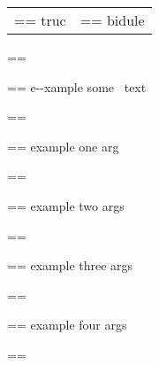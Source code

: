 \documentclass{book}
\makeatletter
\newenvironment{Texinfopreformatted}{%
  \par\GNUTobeylines\obeyspaces\frenchspacing\parskip=\z@\parindent=\z@}{}
{\catcode`\^^M=13 \gdef\GNUTobeylines{\catcode`\^^M=13 \def^^M{\null\par}}}
\newenvironment{Texinfoindented}{\begin{list}{}{}\item\relax}{\end{list}}
\renewcommand{\_}{\Texinfounderscore\discretionary{}{}{}}
\makeatother
\begin{document}
\begin{Texinfoindented}
\begin{tabular}{m{} m{}}
\begin{Texinfopreformatted}%
\ttfamily truc \end{Texinfopreformatted}&
\begin{Texinfopreformatted}%
\ttfamily bidule
\end{Texinfopreformatted}\\
\end{tabular}%
\begin{Texinfopreformatted}%
\ttfamily 
\end{Texinfopreformatted}
\begin{Texinfoindented}
\begin{Texinfopreformatted}%
\ttfamily e{-}{-}xample  some
\   text
\end{Texinfopreformatted}
\end{Texinfoindented}
\begin{Texinfopreformatted}%
\ttfamily 
\end{Texinfopreformatted}
\begin{Texinfoindented}
\begin{Texinfopreformatted}%
\ttfamily example one arg
\end{Texinfopreformatted}
\end{Texinfoindented}
\begin{Texinfopreformatted}%
\ttfamily 
\end{Texinfopreformatted}
\begin{Texinfoindented}
\begin{Texinfopreformatted}%
\ttfamily example two args
\end{Texinfopreformatted}
\end{Texinfoindented}
\begin{Texinfopreformatted}%
\ttfamily 
\end{Texinfopreformatted}
\begin{Texinfoindented}
\begin{Texinfopreformatted}%
\ttfamily example three args
\end{Texinfopreformatted}
\end{Texinfoindented}
\begin{Texinfopreformatted}%
\ttfamily 
\end{Texinfopreformatted}
\begin{Texinfoindented}
\begin{Texinfopreformatted}%
\ttfamily example four args
\end{Texinfopreformatted}
\end{Texinfoindented}
\begin{Texinfopreformatted}%

\end{Texinfopreformatted}
\end{Texinfoindented}
\end{document}
